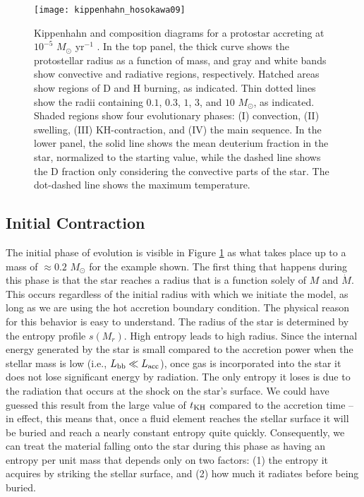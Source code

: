 \begin{figure}
\texttt{[image: kippenhahn\_hosokawa09]}
\caption[Kippenhahn diagram for an accretion protostar]{
\label{fig:kippenhahn_hosokawa09}
Kippenhahn and composition diagrams for a protostar accreting at $10^{-5}$ $M_\odot$ yr$^{-1}$ \citep{hosokawa09a}. In the top panel, the thick curve shows the protostellar radius as a function of mass, and gray and white bands show convective and radiative regions, respectively. Hatched areas show regions of D and H burning, as indicated. Thin dotted lines show the radii containing $0.1$, $0.3$, $1$, $3$, and $10$ $M_\odot$, as indicated. Shaded regions show four evolutionary phases: (I) convection, (II) swelling, (III) KH-contraction, and (IV) the main sequence. In the lower panel, the solid line shows the mean deuterium fraction in the star, normalized to the starting value, while the dashed line shows the D fraction only considering the convective parts of the star. The dot-dashed line shows the maximum temperature.
}
\end{figure}

\subsection{Initial Contraction}

The initial phase of evolution is visible in Figure \ref{fig:kippenhahn_hosokawa09} as what takes place up to a mass of $\approx 0.2$ $M_\odot$ for the example shown. The first thing that happens during this phase is that the star reaches a radius that is a function solely of $M$ and $\dot{M}$. This occurs regardless of the initial radius with which we initiate the model, as long as we are using the hot accretion boundary condition. The physical reason for this behavior is easy to understand. The radius of the star is determined by the entropy profile $s(M_r)$. High entropy leads to high radius. Since the internal energy generated by the star is small compared to the accretion power when the stellar mass is low (i.e., $L_{\rm bb} \ll L_{\rm acc}$), once gas is incorporated into the star it does not lose significant energy by radiation. The only entropy it loses is due to the radiation that occurs at the shock on the star's surface. We could have guessed this result from the large value of $t_{\rm KH}$ compared to the accretion time -- in effect, this means that, once a fluid element reaches the stellar surface it will be buried and reach a nearly constant entropy quite quickly. Consequently, we can treat the material falling onto the star during this phase as having an entropy per unit mass that depends only on two factors: (1) the entropy it acquires by striking the stellar surface, and (2) how much it radiates before being buried.

